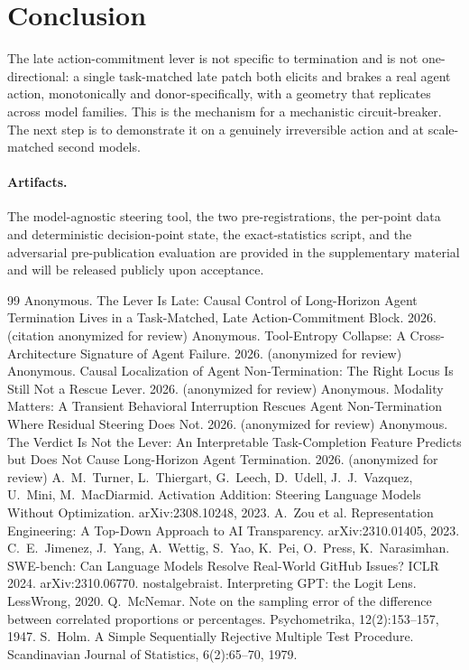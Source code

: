 \documentclass[11pt]{article}
\begin{document}
\section{Conclusion}
The late action-commitment lever is not specific to termination and is not one-directional: a single
task-matched late patch both elicits and brakes a real agent action, monotonically and donor-specifically, with
a geometry that replicates across model families. This is the mechanism for a mechanistic circuit-breaker. The
next step is to demonstrate it on a genuinely irreversible action and at scale-matched second models.

\paragraph{Artifacts.} The model-agnostic steering tool, the two pre-registrations, the per-point data and deterministic decision-point state, the exact-statistics script, and the adversarial pre-publication evaluation are provided in the supplementary material and will be released publicly upon acceptance.

\begin{thebibliography}{99}
 Anonymous. The Lever Is Late: Causal Control of Long-Horizon Agent Termination Lives in a Task-Matched, Late Action-Commitment Block. 2026. (citation anonymized for review)
 Anonymous. Tool-Entropy Collapse: A Cross-Architecture Signature of Agent Failure. 2026. (anonymized for review)
 Anonymous. Causal Localization of Agent Non-Termination: The Right Locus Is Still Not a Rescue Lever. 2026. (anonymized for review)
 Anonymous. Modality Matters: A Transient Behavioral Interruption Rescues Agent Non-Termination Where Residual Steering Does Not. 2026. (anonymized for review)
 Anonymous. The Verdict Is Not the Lever: An Interpretable Task-Completion Feature Predicts but Does Not Cause Long-Horizon Agent Termination. 2026. (anonymized for review)
 A.~M.~Turner, L.~Thiergart, G.~Leech, D.~Udell, J.~J.~Vazquez, U.~Mini, M.~MacDiarmid. Activation Addition: Steering Language Models Without Optimization. arXiv:2308.10248, 2023.
 A.~Zou et al. Representation Engineering: A Top-Down Approach to AI Transparency. arXiv:2310.01405, 2023.
 C.~E.~Jimenez, J.~Yang, A.~Wettig, S.~Yao, K.~Pei, O.~Press, K.~Narasimhan. SWE-bench: Can Language Models Resolve Real-World GitHub Issues? ICLR 2024. arXiv:2310.06770.
 nostalgebraist. Interpreting GPT: the Logit Lens. LessWrong, 2020.
 Q.~McNemar. Note on the sampling error of the difference between correlated proportions or percentages. Psychometrika, 12(2):153--157, 1947.
 S.~Holm. A Simple Sequentially Rejective Multiple Test Procedure. Scandinavian Journal of Statistics, 6(2):65--70, 1979.
\end{thebibliography}
\end{document}
